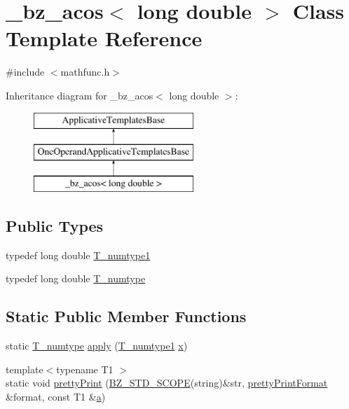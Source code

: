 \hypertarget{class__bz__acos_3_01long_01double_01_4}{}\section{\+\_\+bz\+\_\+acos$<$ long double $>$ Class Template Reference}
\label{class__bz__acos_3_01long_01double_01_4}


{\ttfamily \#include $<$mathfunc.\+h$>$}

Inheritance diagram for \+\_\+bz\+\_\+acos$<$ long double $>$\+:\begin{figure}[H]
\begin{center}
\leavevmode
\includegraphics[height=3.000000cm]{class__bz__acos_3_01long_01double_01_4}
\end{center}
\end{figure}
\subsection*{Public Types}
\begin{DoxyCompactItemize}
\item 
typedef long double \hyperlink{class__bz__acos_3_01long_01double_01_4_a8ee873ec646b6795dedbd15870337a34}{T\+\_\+numtype1}
\item 
typedef long double \hyperlink{class__bz__acos_3_01long_01double_01_4_ac36b01e184b605dbb517dce61c8024b5}{T\+\_\+numtype}
\end{DoxyCompactItemize}
\subsection*{Static Public Member Functions}
\begin{DoxyCompactItemize}
\item 
static \hyperlink{class__bz__acos_3_01long_01double_01_4_ac36b01e184b605dbb517dce61c8024b5}{T\+\_\+numtype} \hyperlink{class__bz__acos_3_01long_01double_01_4_ad539adc40c5b36460c44893995b1fc3a}{apply} (\hyperlink{class__bz__acos_3_01long_01double_01_4_a8ee873ec646b6795dedbd15870337a34}{T\+\_\+numtype1} \hyperlink{vecnorm1_8cc_ac73eed9e41ec09d58f112f06c2d6cb63}{x})
\item 
{\footnotesize template$<$typename T1 $>$ }\\static void \hyperlink{class__bz__acos_3_01long_01double_01_4_a6a35b4be09e9ff4fc57ca5ef1c92c7c3}{pretty\+Print} (\hyperlink{numinquire_8h_a2b24ffc3b4ef9803956bc7715c6c7b83}{B\+Z\+\_\+\+S\+T\+D\+\_\+\+S\+C\+O\+P\+E}(string)\&str, \hyperlink{classprettyPrintFormat}{pretty\+Print\+Format} \&format, const T1 \&\hyperlink{gen__mat5files_8m_aae328bf20413f220e38aec4d95bfd6da}{a})
\end{DoxyCompactItemize}


